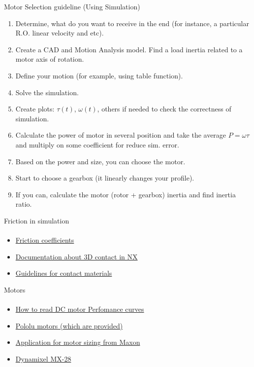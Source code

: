 \documentclass[aspectratio=169]{beamer}
\begin{document}
\begin{frame}[t]{Motor Selection guideline (Using Simulation)}
    \vspace{-0.5cm }
    \begin{enumerate}
        \small
        \item Determine, what do you want to receive in the end (for instance, a particular R.O. linear velocity and etc).
        \item Create a CAD and Motion Analysis model. Find a load inertia related to a motor axis of rotation.
        \item Define your motion (for example, using table function).
        \item Solve the simulation.
        \item Create plots: $\tau (t)$, $\omega (t)$, others if needed to check the correctness of simulation.
        \item Calculate the power of motor in several position and take the average $P = \omega \tau$ and multiply on some coefficient for reduce sim. error.
        \item Based on the power and size, you can choose the motor.
        \item Start to choose a gearbox (it linearly changes your profile).
        \item If you can, calculate the motor (rotor + gearbox) inertia and find inertia ratio.
    \end{enumerate}
\end{frame}

\begin{frame}[t]{Friction in simulation}
\framesubtitle{}
    \begin{itemize}
        \item \href{https://www.engineeringtoolbox.com/friction-coefficients-d_778.html}{Friction coefficients}
        \item \href{https://docs.sw.siemens.com/en-US/doc/289054037/PL20201105153211099.motion/id563056}{Documentation about 3D contact in NX}
        \item \href{https://docs.sw.siemens.com/en-US/doc/289054037/PL20201105153211099.motion/id562936}{Guidelines for contact materials}
    \end{itemize}
\end{frame}

\begin{frame}[t]{Motors}
\framesubtitle{}
    \begin{itemize}
        \item \href{https://islproducts.com/design-note/how-to-read-dc-motor-gear-motor-performance-curves/}{How to read DC motor Perfomance curves}
        \item \href{https://www.pololu.com/product/3204}{Pololu motors (which are provided)}
        \item \href{https://www.maxongroup.net.au/maxon/view/msp}{Application for motor sizing from Maxon}
        \item \href{https://emanual.robotis.com/docs/en/dxl/mx/mx-28/}{Dynamixel MX-28}
    \end{itemize}
\end{frame}
\end{document}
